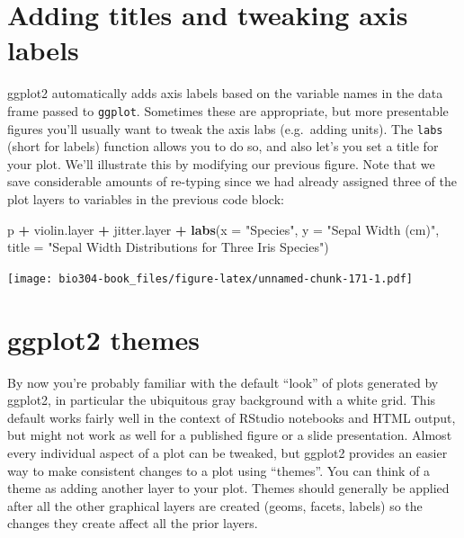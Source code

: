 \documentclass[]{book}
\newenvironment{Shaded}{\begin{snugshade}}{\end{snugshade}}
\newcommand{\DataTypeTok}[1]{\textcolor[rgb]{0.13,0.29,0.53}{#1}}
\newcommand{\KeywordTok}[1]{\textcolor[rgb]{0.13,0.29,0.53}{\textbf{#1}}}
\newcommand{\NormalTok}[1]{#1}
\newcommand{\OperatorTok}[1]{\textcolor[rgb]{0.81,0.36,0.00}{\textbf{#1}}}
\newcommand{\StringTok}[1]{\textcolor[rgb]{0.31,0.60,0.02}{#1}}
\theoremstyle{definition}
\theoremstyle{definition}
\theoremstyle{definition}
\theoremstyle{remark}
\begin{document}
\hypertarget{adding-titles-and-tweaking-axis-labels}{%
\section{Adding titles and tweaking axis
labels}\label{adding-titles-and-tweaking-axis-labels}}

ggplot2 automatically adds axis labels based on the variable names in
the data frame passed to \texttt{ggplot}. Sometimes these are
appropriate, but more presentable figures you'll usually want to tweak
the axis labs (e.g.~adding units). The \texttt{labs} (short for labels)
function allows you to do so, and also let's you set a title for your
plot. We'll illustrate this by modifying our previous figure. Note that
we save considerable amounts of re-typing since we had already assigned
three of the plot layers to variables in the previous code block:

\begin{Shaded}
\begin{Highlighting}[]
\NormalTok{p }\OperatorTok{+}\StringTok{ }\NormalTok{violin.layer }\OperatorTok{+}\StringTok{ }\NormalTok{jitter.layer }\OperatorTok{+}\StringTok{ }
\StringTok{  }\KeywordTok{labs}\NormalTok{(}\DataTypeTok{x =} \StringTok{"Species"}\NormalTok{, }\DataTypeTok{y =} \StringTok{"Sepal Width (cm)"}\NormalTok{, }
       \DataTypeTok{title =} \StringTok{"Sepal Width Distributions for Three Iris Species"}\NormalTok{)}
\end{Highlighting}
\end{Shaded}

\texttt{[image: bio304-book\_files/figure-latex/unnamed-chunk-171-1.pdf]}

\hypertarget{ggplot2-themes}{%
\section{ggplot2 themes}\label{ggplot2-themes}}

By now you're probably familiar with the default ``look'' of plots
generated by ggplot2, in particular the ubiquitous gray background with
a white grid. This default works fairly well in the context of RStudio
notebooks and HTML output, but might not work as well for a published
figure or a slide presentation. Almost every individual aspect of a plot
can be tweaked, but ggplot2 provides an easier way to make consistent
changes to a plot using ``themes''. You can think of a theme as adding
another layer to your plot. Themes should generally be applied after all
the other graphical layers are created (geoms, facets, labels) so the
changes they create affect all the prior layers.
\end{document}
